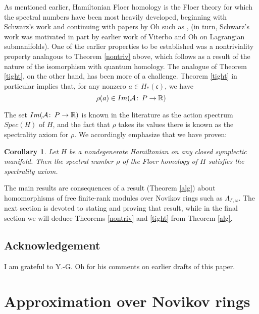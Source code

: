 \documentclass{amsart}
\theoremstyle{plain}
\newtheorem{cor}[theorem]{Corollary}
\theoremstyle{definition}
\theoremstyle{remark}
\def\co{\colon\thinspace}
\begin{document}
As mentioned earlier, Hamiltonian Floer homology is the Floer theory for which the spectral numbers have been most heavily developed, beginning with Schwarz's work \cite{S} and continuing with papers by Oh such as \cite{Oh1}, \cite{Oh2} (in turn, Schwarz's work was motivated in part by earlier work of Viterbo and Oh on Lagrangian submanifolds).  One of the earlier properties to be established was a nontriviality property analagous to Theorem \ref{nontriv} above, which follows as a result of the nature of the isomorphism with quantum homology.  The analogue of Theorem \ref{tight}, on the other hand, has been more of a challenge.
Theorem \ref{tight} in particular implies that, for any nonzero $a\in H_*(\mathfrak{c})$, we have
 \[ \rho(a)\in Im(\mathcal{A}\co P\to \mathbb{R}) \]  

The set $Im(\mathcal{A}\co P\to\mathbb{R})$ is known in the literature as the action spectrum $Spec(H)$ of $H$, and the fact that $\rho$ takes its values there is known as the spectrality axiom for $\rho$.  We accordingly emphasize that we have proven:

\begin{cor} Let $H$ be a nondegenerate Hamiltonian on any closed symplectic manifold.  Then the spectral number $\rho$ of the Floer homology of $H$ satisfies the spectrality axiom.\end{cor}

The main results are consequences of a result (Theorem \ref{alg}) about homomorphisms of free finite-rank modules over Novikov rings such as $\Lambda_{\Gamma,\omega}$.  The next section is devoted to stating and proving that result, while in the final section we will deduce Theorems \ref{nontriv} and \ref{tight} from Theorem \ref{alg}.



\subsection*{Acknowledgement}
I am grateful to Y.-G. Oh for his comments on earlier drafts of this paper. 


\section{Approximation over Novikov rings}
\end{document}
